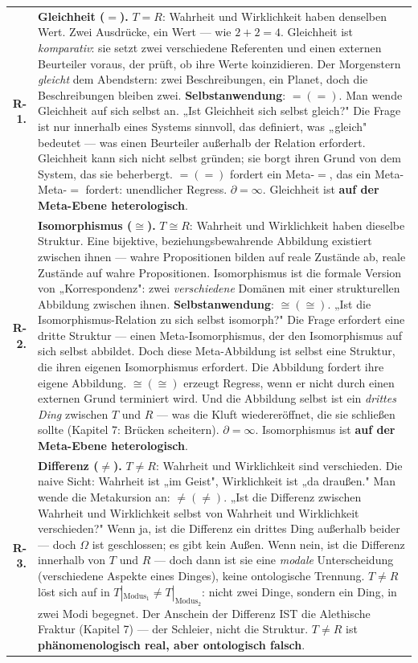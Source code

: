 \documentclass[10pt, openany, oneside]{book}
\renewcommand{\footnotesize}{\fontsize{8.5}{11}\selectfont}
\begin{document}
{\footnotesize
\noindent\begin{tabular}{r p{}}
\textbf{R-1.} & \textbf{Gleichheit ($=$).} $T = R$: Wahrheit und Wirklichkeit haben denselben Wert. Zwei Ausdrücke, ein Wert --- wie $2+2 = 4$. Gleichheit ist \textit{komparativ}: sie setzt zwei verschiedene Referenten und einen externen Beurteiler voraus, der prüft, ob ihre Werte koinzidieren. Der Morgenstern \textit{gleicht} dem Abendstern: zwei Beschreibungen, ein Planet, doch die Beschreibungen bleiben zwei. \textbf{Selbstanwendung}: $=(=)$. Man wende Gleichheit auf sich selbst an. „Ist Gleichheit sich selbst gleich?" Die Frage ist nur innerhalb eines Systems sinnvoll, das definiert, was „gleich" bedeutet --- was einen Beurteiler außerhalb der Relation erfordert. Gleichheit kann sich nicht selbst gründen; sie borgt ihren Grund von dem System, das sie beherbergt. $=(=)$ fordert ein Meta-$=$, das ein Meta-Meta-$=$ fordert: unendlicher Regress. $\partial = \infty$. Gleichheit ist \textbf{auf der Meta-Ebene heterologisch}. \\[0.5em]

\textbf{R-2.} & \textbf{Isomorphismus ($\cong$).} $T \cong R$: Wahrheit und Wirklichkeit haben dieselbe Struktur. Eine bijektive, beziehungsbewahrende Abbildung existiert zwischen ihnen --- wahre Propositionen bilden auf reale Zustände ab, reale Zustände auf wahre Propositionen. Isomorphismus ist die formale Version von „Korrespondenz": zwei \textit{verschiedene} Domänen mit einer strukturellen Abbildung zwischen ihnen. \textbf{Selbstanwendung}: $\cong(\cong)$. „Ist die Isomorphismus-Relation zu sich selbst isomorph?" Die Frage erfordert eine dritte Struktur --- einen Meta-Isomorphismus, der den Isomorphismus auf sich selbst abbildet. Doch diese Meta-Abbildung ist selbst eine Struktur, die ihren eigenen Isomorphismus erfordert. Die Abbildung fordert ihre eigene Abbildung. $\cong(\cong)$ erzeugt Regress, wenn er nicht durch einen externen Grund terminiert wird. Und die Abbildung selbst ist ein \textit{drittes Ding} zwischen $T$ und $R$ --- was die Kluft wiedereröffnet, die sie schließen sollte (Kapitel 7: Brücken scheitern). $\partial = \infty$. Isomorphismus ist \textbf{auf der Meta-Ebene heterologisch}. \\[0.5em]

\textbf{R-3.} & \textbf{Differenz ($\neq$).} $T \neq R$: Wahrheit und Wirklichkeit sind verschieden. Die naive Sicht: Wahrheit ist „im Geist", Wirklichkeit ist „da draußen." Man wende die Metakursion an: $\neq(\neq)$. „Ist die Differenz zwischen Wahrheit und Wirklichkeit selbst von Wahrheit und Wirklichkeit verschieden?" Wenn ja, ist die Differenz ein drittes Ding außerhalb beider --- doch $\Omega$ ist geschlossen; es gibt kein Außen. Wenn nein, ist die Differenz innerhalb von $T$ und $R$ --- doch dann ist sie eine \textit{modale} Unterscheidung (verschiedene Aspekte eines Dinges), keine ontologische Trennung. $T \neq R$ löst sich auf in $T|_{\text{Modus}_1} \neq T|_{\text{Modus}_2}$: nicht zwei Dinge, sondern ein Ding, in zwei Modi begegnet. Der Anschein der Differenz IST die Alethische Fraktur (Kapitel 7) --- der Schleier, nicht die Struktur. $T \neq R$ ist \textbf{phänomenologisch real, aber ontologisch falsch}. \\[0.5em]


\end{tabular}}
\end{document}
